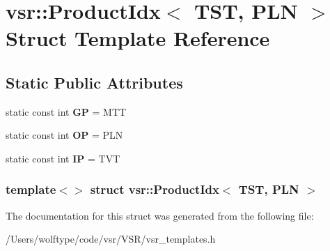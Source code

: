 \hypertarget{structvsr_1_1_product_idx_3_01_t_s_t_00_01_p_l_n_01_4}{\section{vsr\-:\-:Product\-Idx$<$ T\-S\-T, P\-L\-N $>$ Struct Template Reference}
\label{structvsr_1_1_product_idx_3_01_t_s_t_00_01_p_l_n_01_4}
}
\subsection*{Static Public Attributes}
\begin{DoxyCompactItemize}
\item 
\hypertarget{structvsr_1_1_product_idx_3_01_t_s_t_00_01_p_l_n_01_4_a022304a12fa31e1b9309378472531391}{static const int {\bfseries G\-P} = M\-T\-T}\label{structvsr_1_1_product_idx_3_01_t_s_t_00_01_p_l_n_01_4_a022304a12fa31e1b9309378472531391}

\item 
\hypertarget{structvsr_1_1_product_idx_3_01_t_s_t_00_01_p_l_n_01_4_af9691199e965633680a6af4e87b02eb2}{static const int {\bfseries O\-P} = P\-L\-N}\label{structvsr_1_1_product_idx_3_01_t_s_t_00_01_p_l_n_01_4_af9691199e965633680a6af4e87b02eb2}

\item 
\hypertarget{structvsr_1_1_product_idx_3_01_t_s_t_00_01_p_l_n_01_4_a0340546f90ac7338ad327813ff90d5b5}{static const int {\bfseries I\-P} = T\-V\-T}\label{structvsr_1_1_product_idx_3_01_t_s_t_00_01_p_l_n_01_4_a0340546f90ac7338ad327813ff90d5b5}

\end{DoxyCompactItemize}
\subsubsection*{template$<$$>$ struct vsr\-::\-Product\-Idx$<$ T\-S\-T, P\-L\-N $>$}



The documentation for this struct was generated from the following file\-:\begin{DoxyCompactItemize}
\item 
/\-Users/wolftype/code/vsr/\-V\-S\-R/vsr\-\_\-templates.\-h\end{DoxyCompactItemize}
